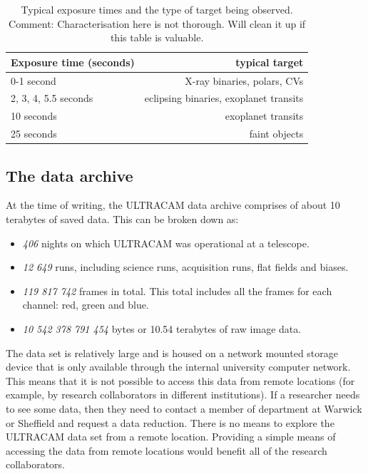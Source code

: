 \begin{table}
  \begin{center}
	\begin{tabular}{|l|r|}
		\hline
		Exposure time (seconds) & typical target \\
		\hline
		0-1 second & X-ray binaries, polars, CVs \\
		2, 3, 4, 5.5 seconds & eclipsing binaries, exoplanet transits \\
		10 seconds & exoplanet transits \\
		25 seconds & faint objects \\
		\hline
	\end{tabular}
  \end{center}
\label{tab:breakdown}
\caption{Typical exposure times and the type of target being observed. Comment: Characterisation here is not thorough. Will clean it up if this table is valuable.
}
\end{table}

\subsection{The data archive}
At the time of writing, the ULTRACAM data archive comprises of about 10 terabytes of saved data. This can be broken down as:
\begin{itemize}
	\item \emph{406} nights on which ULTRACAM was operational at a telescope.
	\item \emph{12 649} runs, including science runs, acquisition runs, flat fields and biases. 
	\item \emph{119 817 742} frames in total. This total includes all the frames for each channel: red, green and blue.
	\item \emph{10 542 378 791 454} bytes or 10.54 terabytes of raw image data.
\end{itemize} 

The data set is relatively large and is housed on a network mounted storage device that is only available through the internal university computer network. This means that it is not possible to access this data from remote locations (for example, by research collaborators in different institutions). If a researcher needs to see some data, then they need to contact a member of department at Warwick or Sheffield and request a data reduction. There is no means to explore the ULTRACAM data set from a remote location. Providing a simple means of accessing the data from remote locations would benefit all of the research collaborators. 

